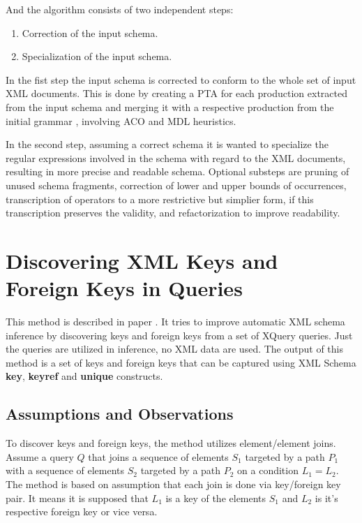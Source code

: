 And the algorithm consists of two independent steps:

\begin{enumerate}
\item Correction of the input schema.
\item Specialization of the input schema.
\end{enumerate}

In the fist step the input schema is corrected to conform to the whole set of input XML documents. This is done by creating a PTA  for each production extracted from the input schema and merging it with a respective production from the initial grammar , involving ACO and MDL heuristics.

In the second step, assuming a correct schema it is wanted to specialize the regular expressions involved in the schema with regard to the XML documents, resulting in more precise and readable schema. Optional substeps are pruning of unused schema fragments, correction of lower and upper bounds of occurrences, transcription of operators to a more restrictive but simplier form, if this transcription preserves the validity, and refactorization to improve readability.

\section{Discovering XML Keys and Foreign Keys in Queries}
This method is described in paper \cite{Necasky:2009:DXK:1529282.1529414}. It tries to improve automatic XML schema inference by discovering keys and foreign keys from a set of XQuery queries. Just the queries are utilized in inference, no XML data are used. The output of this method is a set of keys and foreign keys that can be captured using XML Schema \textbf{key}, \textbf{keyref} and \textbf{unique} constructs.

\subsection{Assumptions and Observations}
To discover keys and foreign keys, the method utilizes element/element joins. Assume a query $Q$ that joins a sequence of elements $S_1$ targeted by a path $P_1$ with a sequence of elements $S_2$ targeted by a path $P_2$ on a condition $L_1 = L_2$.
The method is based on assumption that each join is done via key/foreign key pair. It means it is supposed that $L_1$ is a key of the elements $S_1$ and $L_2$ is it's respective foreign key or vice versa.

